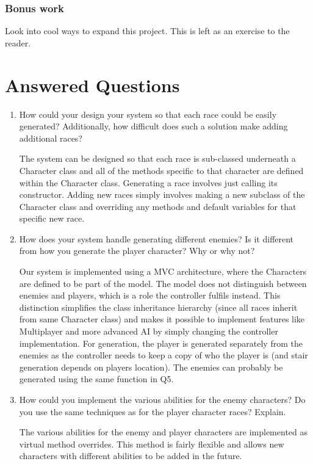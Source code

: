 \documentclass[12pt]{article}
\begin{document}
\subsubsection*{Bonus work}
Look into cool ways to expand this project. This is left as an exercise to the reader.


\section*{Answered Questions}


\begin{enumerate}
\item How could your design your system so that each race could be easily generated? Additionally, how difficult does such a solution make adding additional races?


The system can be designed so that each race is sub-classed underneath a Character class and all of the methods specific to that character are defined within the Character class. Generating a race involves just calling its constructor. Adding new races simply involves making a new subclass of the Character class and overriding any methods and default variables for that specific new race.


\item How does your system handle generating different enemies? Is it different from how you generate the player character? Why or why not?


Our system is implemented using a MVC architecture, where the Characters are defined to be part of the model. The model does not distinguish between enemies and players, which is a role the controller fulfils instead. This distinction simplifies the class inheritance hierarchy (since all races inherit from same Character class) and makes it possible to implement features like Multiplayer and more advanced AI by simply changing the controller implementation. For generation, the player is generated separately from the enemies as the controller needs to keep a copy of who the player is (and stair generation depends on players location). The enemies can probably be generated using the same function in Q5.

\item How could you implement the various abilities for the enemy characters? Do you use the same techniques as for the player character races? Explain.


The various abilities for the enemy and player characters are implemented as virtual method overrides. This method is fairly flexible and allows new characters with different abilities to be added in the future.



\end{enumerate}
\end{document}
